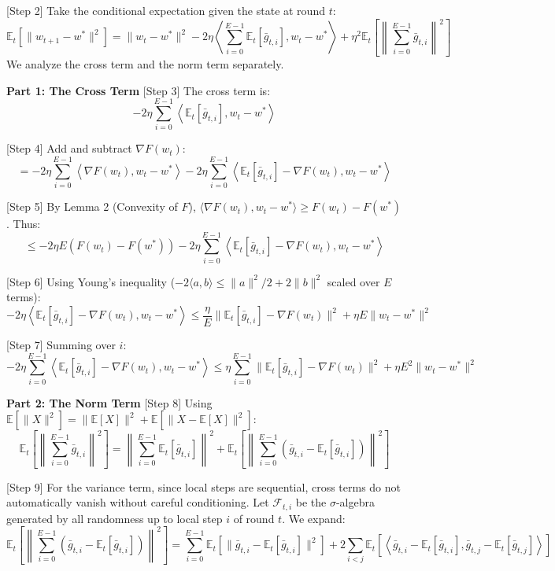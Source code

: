 \documentclass{article}
\begin{document}
[Step 2] Take the conditional expectation given the state at round $t$:
$$ \mathbb{E}_t[\|w_{t+1} - w^*\|^2] = \|w_t - w^*\|^2 - 2\eta \left\langle \sum_{i=0}^{E-1} \mathbb{E}_t[\bar{g}_{t,i}], w_t - w^* \right\rangle + \eta^2 \mathbb{E}_t\left[ \left\| \sum_{i=0}^{E-1} \bar{g}_{t,i} \right\|^2 \right] $$
We analyze the cross term and the norm term separately.

\textbf{Part 1: The Cross Term}
[Step 3] The cross term is:
$$ -2\eta \sum_{i=0}^{E-1} \left\langle \mathbb{E}_t[\bar{g}_{t,i}], w_t - w^* \right\rangle $$

[Step 4] Add and subtract $\nabla F(w_t)$:
$$ = -2\eta \sum_{i=0}^{E-1} \left\langle \nabla F(w_t), w_t - w^* \right\rangle - 2\eta \sum_{i=0}^{E-1} \left\langle \mathbb{E}_t[\bar{g}_{t,i}] - \nabla F(w_t), w_t - w^* \right\rangle $$

[Step 5] By Lemma 2 (Convexity of $F$), $\langle \nabla F(w_t), w_t - w^* \rangle \geq F(w_t) - F(w^*)$. Thus:
$$ \leq -2\eta E (F(w_t) - F(w^*)) - 2\eta \sum_{i=0}^{E-1} \left\langle \mathbb{E}_t[\bar{g}_{t,i}] - \nabla F(w_t), w_t - w^* \right\rangle $$

[Step 6] Using Young's inequality ($-2\langle a, b\rangle \leq \|a\|^2/2 + 2\|b\|^2$ scaled over $E$ terms):
$$ -2\eta \left\langle \mathbb{E}_t[\bar{g}_{t,i}] - \nabla F(w_t), w_t - w^* \right\rangle \leq \frac{\eta}{E} \|\mathbb{E}_t[\bar{g}_{t,i}] - \nabla F(w_t)\|^2 + \eta E \|w_t - w^*\|^2 $$

[Step 7] Summing over $i$:
$$ -2\eta \sum_{i=0}^{E-1} \left\langle \mathbb{E}_t[\bar{g}_{t,i}] - \nabla F(w_t), w_t - w^* \right\rangle \leq \eta \sum_{i=0}^{E-1} \|\mathbb{E}_t[\bar{g}_{t,i}] - \nabla F(w_t)\|^2 + \eta E^2 \|w_t - w^*\|^2 $$

\textbf{Part 2: The Norm Term}
[Step 8] Using $\mathbb{E}[\|X\|^2] = \|\mathbb{E}[X]\|^2 + \mathbb{E}[\|X - \mathbb{E}[X]\|^2]$:
$$ \mathbb{E}_t\left[ \left\| \sum_{i=0}^{E-1} \bar{g}_{t,i} \right\|^2 \right] = \left\| \sum_{i=0}^{E-1} \mathbb{E}_t[\bar{g}_{t,i}] \right\|^2 + \mathbb{E}_t\left[ \left\| \sum_{i=0}^{E-1} \left( \bar{g}_{t,i} - \mathbb{E}_t[\bar{g}_{t,i}] \right) \right\|^2 \right] $$

[Step 9] For the variance term, since local steps are sequential, cross terms do not automatically vanish without careful conditioning. Let $\mathcal{F}_{t,i}$ be the $\sigma$-algebra generated by all randomness up to local step $i$ of round $t$. We expand:
$$ \mathbb{E}_t\left[ \left\| \sum_{i=0}^{E-1} \left( \bar{g}_{t,i} - \mathbb{E}_t[\bar{g}_{t,i}] \right) \right\|^2 \right] = \sum_{i=0}^{E-1} \mathbb{E}_t[\|\bar{g}_{t,i} - \mathbb{E}_t[\bar{g}_{t,i}]\|^2] + 2\sum_{i<j} \mathbb{E}_t\left[ \left\langle \bar{g}_{t,i} - \mathbb{E}_t[\bar{g}_{t,i}], \bar{g}_{t,j} - \mathbb{E}_t[\bar{g}_{t,j}] \right\rangle \right] $$
\end{document}
